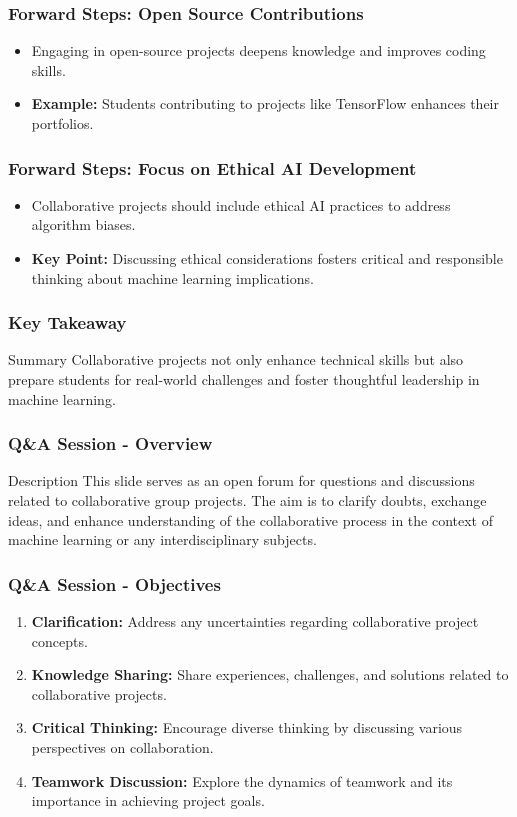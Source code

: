 \documentclass[aspectratio=169]{beamer}
\begin{document}
\begin{frame}[fragile]
    \frametitle{Forward Steps: Open Source Contributions}
    \begin{itemize}
        \item Engaging in open-source projects deepens knowledge and improves coding skills.
        \item \textbf{Example:} Students contributing to projects like TensorFlow enhances their portfolios.
    \end{itemize}
\end{frame}

\begin{frame}[fragile]
    \frametitle{Forward Steps: Focus on Ethical AI Development}
    \begin{itemize}
        \item Collaborative projects should include ethical AI practices to address algorithm biases.
        \item \textbf{Key Point:} Discussing ethical considerations fosters critical and responsible thinking about machine learning implications.
    \end{itemize}
\end{frame}

\begin{frame}[fragile]
    \frametitle{Key Takeaway}
    \begin{block}{Summary}
        Collaborative projects not only enhance technical skills but also prepare students for real-world challenges and foster thoughtful leadership in machine learning.
    \end{block}
\end{frame}

\begin{frame}[fragile]
    \frametitle{Q\&A Session - Overview}
    \begin{block}{Description}
        This slide serves as an open forum for questions and discussions related to collaborative group projects. The aim is to clarify doubts, exchange ideas, and enhance understanding of the collaborative process in the context of machine learning or any interdisciplinary subjects.
    \end{block}
\end{frame}

\begin{frame}[fragile]
    \frametitle{Q\&A Session - Objectives}
    \begin{enumerate}
        \item \textbf{Clarification:} Address any uncertainties regarding collaborative project concepts.
        \item \textbf{Knowledge Sharing:} Share experiences, challenges, and solutions related to collaborative projects.
        \item \textbf{Critical Thinking:} Encourage diverse thinking by discussing various perspectives on collaboration.
        \item \textbf{Teamwork Discussion:} Explore the dynamics of teamwork and its importance in achieving project goals.
    \end{enumerate}
\end{frame}
\end{document}
